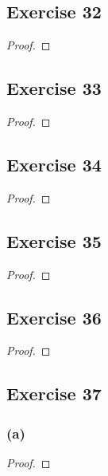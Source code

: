 \documentclass[14pt]{extarticle}
\begin{document}
\subsection{Exercise 32}

\begin{proof}

\end{proof}

\subsection{Exercise 33}

\begin{proof}

\end{proof}

\subsection{Exercise 34}

\begin{proof}

\end{proof}

\subsection{Exercise 35}

\begin{proof}

\end{proof}

\subsection{Exercise 36}

\begin{proof}

\end{proof}

\subsection{Exercise 37}
\subsubsection{(a)}

\begin{proof}

\end{proof}
\end{document}

